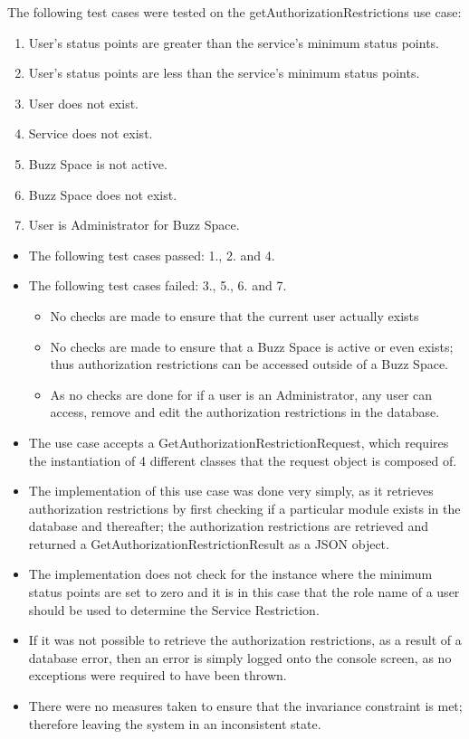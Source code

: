 The following test cases were tested on the getAuthorizationRestrictions use case:
\begin{enumerate}
	\item User's status points are greater than the service's minimum status points.
	\item User's status points are less than the service's minimum status points.
	\item User does not exist.
  	\item Service does not exist.
  	\item Buzz Space is not active.
  	\item Buzz Space does not exist.
  	\item User is Administrator for Buzz Space.
\end{enumerate}
\medskip
\begin{itemize}
\item The following test cases passed: 1., 2. and 4.
	
\item The following test cases failed: 3., 5., 6. and 7.
	\begin{itemize}
		\item No checks are made to ensure that the current user actually exists
		\item No checks are made to ensure that a Buzz Space is active or even exists; thus authorization restrictions can be accessed outside of a Buzz Space.
		\item As no checks are done for if a user is an Administrator, any user can access, remove and edit the authorization restrictions in the database.
	\end{itemize}

	\item The use case accepts a GetAuthorizationRestrictionRequest, which requires the instantiation of 4 different classes that the request object is composed of.

\item The implementation of this use case was done very simply, as it retrieves authorization restrictions by first checking if a particular module exists in the database and thereafter; the authorization restrictions are retrieved and returned a GetAuthorizationRestrictionResult as a JSON object.

\item The implementation does not check for the instance where the minimum status points are set to zero and it is in this case that the role name of a user should be used to determine the Service Restriction. 

\item If it was not possible to retrieve the authorization restrictions, as a result of a database error, then an error is simply logged onto the console screen, as no exceptions were required to have been thrown.

\item There were no measures taken to ensure that the invariance constraint is met; therefore leaving the system in an inconsistent state.


\end{itemize}





